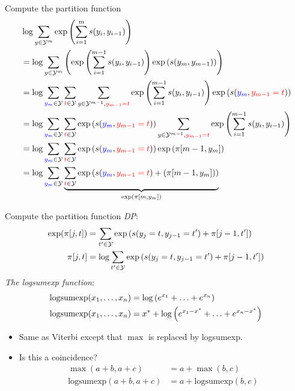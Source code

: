 \documentclass[usenames,dvipsnames,notes]{beamer}
\begin{document}
\begin{frame}
    {Compute the partition function}
    \vspace{-1.5em}
    \begin{align*}
        & \log\sum_{y\in\mathcal{Y}^m} \exp\left(  \sum_{i=1}^m s(y_i,y_{i-1})  \right) \\
        &= \log\sum_{y\in\mathcal{Y}^m} \left(  \exp\left(  \sum_{i=1}^{m-1} s(y_i,y_{i-1})  \right)\exp\left( s(y_m,y_{m-1}) \right)   \right) \\
        &= \log\sum_{{\color{blue}y_m}\in\mathcal{Y}}\sum_{{\color{red}t}\in\mathcal{Y}}\sum_{y\in\mathcal{Y}^{m-1},{\color{red}y_{m-1}=t}}
           \exp\left(  \sum_{i=1}^{m-1} s(y_i,y_{i-1})  \right)
           \exp\left( s({\color{blue}y_m},{\color{red}y_{m-1}=t}) \right)  \\
        &= \log\sum_{{\color{blue}y_m}\in\mathcal{Y}}\sum_{{\color{red}t}\in\mathcal{Y}}
        \exp\left( s({\color{blue}y_m},{\color{red}y_{m-1}=t}) \right)
        \sum_{y\in\mathcal{Y}^{m-1},{\color{red}y_{m-1}=t}}
        \exp\left(  \sum_{i=1}^{m-1} s(y_i,y_{i-1})  \right) \\
        &= \log\sum_{{\color{blue}y_m}\in\mathcal{Y}}\sum_{{\color{red}t}\in\mathcal{Y}}
        \exp\left( s({\color{blue}y_m},{\color{red}y_{m-1}=t}) \right)
        \exp\left( \pi[m-1,y_m] \right)\\
        &= \log\sum_{{\color{blue}y_m}\in\mathcal{Y}}
        \underbrace{
        \sum_{{\color{red}t}\in\mathcal{Y}}
        \exp\left( s({\color{blue}y_m},{\color{red}y_{m-1}=t})
        + \left( \pi[m-1,y_m] \right)
         \right)
    }_{\exp\left( \pi[m,y_m] \right)}
    \end{align*}
\end{frame}

\begin{frame}
    {Compute the partition function}
    \emph{DP}:
    \vspace{-0.5em}
    \begin{align*}
        \exp(\pi[j,t]) &= \sum_{t'\in\mathcal{Y}}\exp\left(  s(y_j=t,y_{j-1}=t') + \pi[j-1,t']  \right)\\
        \pi[j,t] &= \log\sum_{t'\in\mathcal{Y}}\exp\left(  s(y_j=t,y_{j-1}=t') + \pi[j-1,t']  \right)
    \end{align*}
    \emph{The logsumexp function}:
    \begin{align*}
        \text{logsumexp}(x_1,\ldots,x_n) &= \log\left(  e^{x_1} + \ldots + e^{x_n}  \right)\\
        \text{logsumexp}(x_1,\ldots,x_n) &= x^* + \log\left(  e^{x_1-x^*} + \ldots + e^{x_n-x^*}  \right)
    \end{align*}
    \vspace{-2em}
    \begin{itemize}
        \item Same as Viterbi except that $\max$ is replaced by logsumexp.
        \item Is this a coincidence?
            \begin{align*}
                \max(a+b,a+c) &= a + \max(b,c) \\
                \text{logsumexp}(a+b,a+c) &= a + \text{logsumexp}(b,c)
            \end{align*}
    \end{itemize}
\end{frame}
\end{document}
